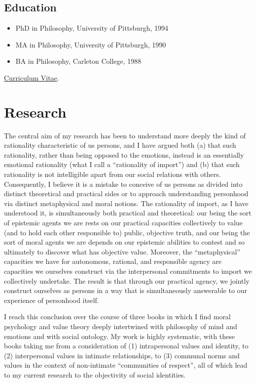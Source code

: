 \documentclass[%
  11pt,%
]{article}
\begin{document}
\subsection*{Education}

\begin{itemize}
  \item PhD in Philosophy, University of Pittsburgh, 1994
  \item MA in Philosophy, University of Pittsburgh, 1990
  \item BA in Philosophy, Carleton College, 1988
\end{itemize}

\noindent\href{https://drive.google.com/file/d/1-8fjo2F9EzgfDyYo_WSTYhaU-xrDNU8P/view}{Curriculum Vitae}.

\section{Research}

The central aim of my research has been to understand more deeply the kind of rationality characteristic of us persons, and I have argued both (a) that such rationality, rather than being opposed to the emotions, instead is an essentially emotional rationality (what I call a \enquote{rationality of import}) and (b) that such rationality is not intelligible apart from our social relations with others. Consequently, I believe it is a mistake to conceive of us persons as divided into distinct theoretical and practical sides or to approach understanding personhood via distinct metaphysical and moral notions. The rationality of import, as I have understood it, is simultaneously both practical and theoretical: our being the sort of epistemic agents we are rests on our practical capacities collectively to value (and to hold each other responsible to) public, objective truth, and our being the sort of moral agents we are depends on our epistemic abilities to contest and so ultimately to discover what has objective value. Moreover, the \enquote{metaphysical} capacities we have for autonomous, rational, and responsible agency are capacities we ourselves construct via the interpersonal commitments to import we collectively undertake. The result is that through our practical agency, we jointly construct ourselves as persons in a way that is simultaneously answerable to our experience of personhood itself.

I reach this conclusion over the course of three books in which I find moral psychology and value theory deeply intertwined with philosophy of mind and emotions and with social ontology. My work is highly systematic, with these books taking me from a consideration of (1) intrapersonal values and identity, to (2) interpersonal values in intimate relationships, to (3) communal norms and values in the context of non-intimate \enquote{communities of respect}, all of which lead to my current research to the objectivity of social identities.
\end{document}
